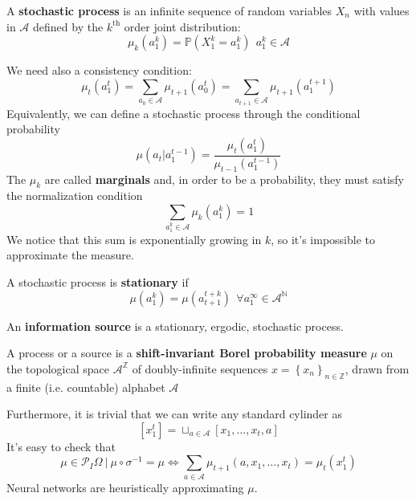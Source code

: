 \begin{definition}
    A \textbf{stochastic process} is an infinite sequence of random variables $X_n$ with values in $\mathcal{A}$ defined by the $k^\text{th}$ order joint distribution:
    \begin{equation*}
        \mu_k\left(a_1^k\right) = \mathbb{P}\left(X_1^k = a_1^k\right) \ \ a_1^k \in \mathcal{A}
    \end{equation*}
\end{definition}
We need also a consistency condition:
\begin{equation*}
    \mu_t\left(a_1^t\right) = \sum_{a_0 \in \mathcal{A}} \mu_{t+1}\left(a_0^t\right) = \sum_{a_{t+1} \in \mathcal{A}} \mu_{t+1}\left(a_1^{t+1}\right)
\end{equation*}
Equivalently, we can define a stochastic process through the conditional probability
\begin{equation*}
    \mu\left(a_t \vert a_1^{t-1}\right) = \frac{\mu_t\left(a_1^t\right)}{\mu_{t-1}\left(a_1^{t-1}\right)}
\end{equation*}
The $\mu_k$ are called \textbf{marginals} and, in order to be a probability, they must satisfy the normalization condition
\begin{equation*}
    \sum_{a_1^k \in \mathcal{A}} \mu_k\left(a_1^k\right) = 1
\end{equation*}
We notice that this sum is exponentially growing in $k$, so it's impossible to approximate the measure.
\begin{definition}
    A stochastic process is \textbf{stationary} if
    \begin{equation*}
        \mu\left(a_1^k\right) = \mu\left(a_{t+1}^{t+k}\right) \ \ \forall a_1^\infty \in \mathcal{A}^\mathbb{N}
    \end{equation*}
\end{definition}
\begin{definition}
    An \textbf{information source} is a stationary, ergodic, stochastic process.
\end{definition}
\begin{definition}
    A process or a source is a \textbf{shift-invariant Borel probability measure} $\mu$ on the topological space $\mathcal{A}^\mathbb{Z}$ of doubly-infinite sequences $x = \left\{x_n\right\}_{n \in \mathbb{Z}}$, drawn from a finite (i.e. countable) alphabet $\mathcal{A}$
\end{definition}
Furthermore, it is trivial that we can write any standard cylinder as
\begin{equation*}
    \left[x_1^t\right] = \sqcup_{a \in \mathcal{A}} \left[x_1, \ldots, x_t, a\right]
\end{equation*}
It's easy to check that
\begin{equation*}
    \mu \in \mathcal{P}_I{\Omega} \ \vert \ \mu \circ \sigma^{-1} = \mu \Leftrightarrow \sum_{a \in \mathcal{A}} \mu_{t+1}\left(a, x_1, \ldots, x_t\right) = \mu_t\left(x_1^t\right)
\end{equation*}
Neural networks are heuristically approximating $\mu$.


